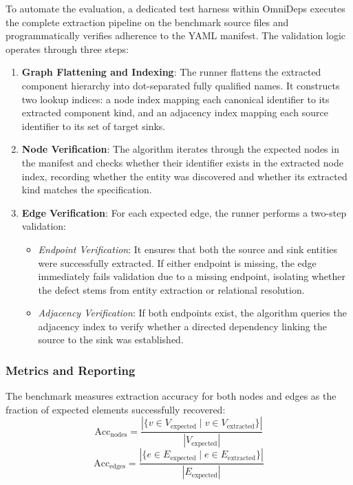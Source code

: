 To automate the evaluation, a dedicated test harness within OmniDeps
executes the complete extraction pipeline on the benchmark source
files and programmatically verifies adherence to the YAML manifest.
The validation logic operates through three steps:
\begin{enumerate}
  \item \textbf{Graph Flattening and Indexing}: The runner flattens
    the extracted component hierarchy into dot-separated fully
    qualified names. It constructs two lookup indices: a node index
    mapping each canonical identifier to its extracted component
    kind, and an adjacency index mapping each source identifier to
    its set of target sinks.
  \item \textbf{Node Verification}: The algorithm iterates through
    the expected nodes in the manifest and checks whether their
    identifier exists in the extracted node index, recording whether
    the entity was discovered and whether its extracted kind matches
    the specification.
  \item \textbf{Edge Verification}: For each expected edge, the
    runner performs a two-step validation:
    \begin{itemize}
      \item \textit{Endpoint Verification}: It ensures that both the
        source and sink entities were successfully extracted. If
        either endpoint is missing, the edge immediately fails
        validation due to a missing endpoint, isolating whether the
        defect stems from entity extraction or relational resolution.
      \item \textit{Adjacency Verification}: If both endpoints exist,
        the algorithm queries the adjacency index to verify whether a
        directed dependency linking the source to the sink was established.
    \end{itemize}
\end{enumerate}

\subsubsection{Metrics and Reporting}
\label{subsec:accuracy_metrics}

The benchmark measures extraction accuracy for both nodes and edges
as the fraction of expected elements successfully recovered:
\begin{equation}
  \text{Acc}_{\text{nodes}} = \frac{|\{v \in V_{\text{expected}} \mid
  v \in V_{\text{extracted}}\}|}{|V_{\text{expected}}|}
\end{equation}
\begin{equation}
  \text{Acc}_{\text{edges}} = \frac{|\{e \in E_{\text{expected}} \mid
  e \in E_{\text{extracted}}\}|}{|E_{\text{expected}}|}
\end{equation}


